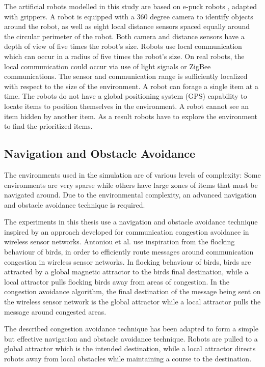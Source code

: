 The artificial robots modelled in this study are based on e-puck robots \cite{mondada2009puck}, adapted with grippers. A robot is equipped with a 360 degree camera to identify objects around the robot, as well as eight local distance sensors spaced equally around the circular perimeter of the robot. Both camera and distance sensors have a depth of view of five times the robot's size. Robots use local communication which can occur in a radius of five times the robot's size. On real robots, the local communication could occur via use of light signals or ZigBee communications. The sensor and communication range is sufficiently localized with respect to the size of the environment. A robot can forage a single item at a time. The robots do not have a global positioning system (GPS) capability to locate items to position themselves in the environment. A robot cannot see an item hidden by another item. As a result robots have to explore the environment to find the prioritized items.

\subsection{Navigation and Obstacle Avoidance}
\label{navigationandobstacleavoidance}

The environments used in the simulation are of various levels of complexity: Some environments are very sparse while others have large zones of items that must be navigated around. Due to the environmental complexity, an advanced navigation and obstacle avoidance technique is required. 

The experiments in this thesis use a navigation and obstacle avoidance technique inspired by an approach developed for communication congestion avoidance in wireless sensor networks\cite{antoniou2012congestion}. Antoniou et al. use inspiration from the flocking behaviour of birds, in order to efficiently route messages around communication congestion in wireless sensor networks. In flocking behaviour of birds, birds are attracted by a global magnetic attractor to the birds final destination, while a local attractor pulls flocking birds away from areas of congestion. In the congestion avoidance algorithm, the final destination of the message being sent on the wireless sensor network is the global attractor while a local attractor pulls the message around congested areas.

The described congestion avoidance technique has been adapted to form a simple but effective navigation and obstacle avoidance technique. Robots are pulled to a global attractor which is the intended destination, while a local attractor directs robots away from local obstacles while maintaining a course to the destination.


